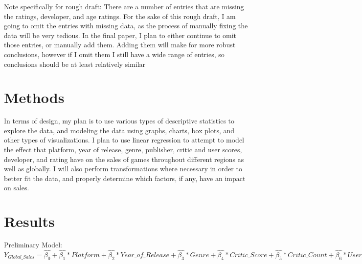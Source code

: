 \documentclass[12pt]{article}
\begin{document}
Note specifically for rough draft: There are a number of entries that are missing the ratings, developer, and age ratings.
For the sake of this rough draft, I am going to omit the entries with missing data, as the process of manually fixing the data
will be very tedious. In the final paper, I plan to either continue to omit those entries, or manually add them. Adding them
will make for more robust conclusions, however if I omit them I still have a wide range of entries, so conclusions should be at least relatively similar

\section{Methods}
\label{sec:meth}
In terms of design, my plan is to use various types of descriptive statistics to explore the data, and modeling the data using graphs, 
charts, box plots, and other types of visualizations. I plan to use linear regression to attempt to model the effect that platform, 
year of release, genre, publisher, critic and user scores, developer, and rating have on the sales of games throughout different regions 
as well as globally. I will also perform transformations where necessary in order to better fit the data, and properly determine which 
factors, if any, have an impact on sales.


\section{Results}
\label{sec:resu}
Preliminary Model:
$Y_{Global\_Sales}=\hat{\beta_{0}}+\hat{\beta_{1}}*Platform+\hat{\beta_{2}}*Year\_of\_Release+\hat{\beta_{3}}*Genre+\hat{\beta_{4}}*Critic\_Score+\hat{\beta_{5}}*Critic\_Count+\hat{\beta_{6}}*User\_Score+\hat{\beta_{7}}*User\_Count+\hat{\beta_{8}}*Rating$
\end{document}

